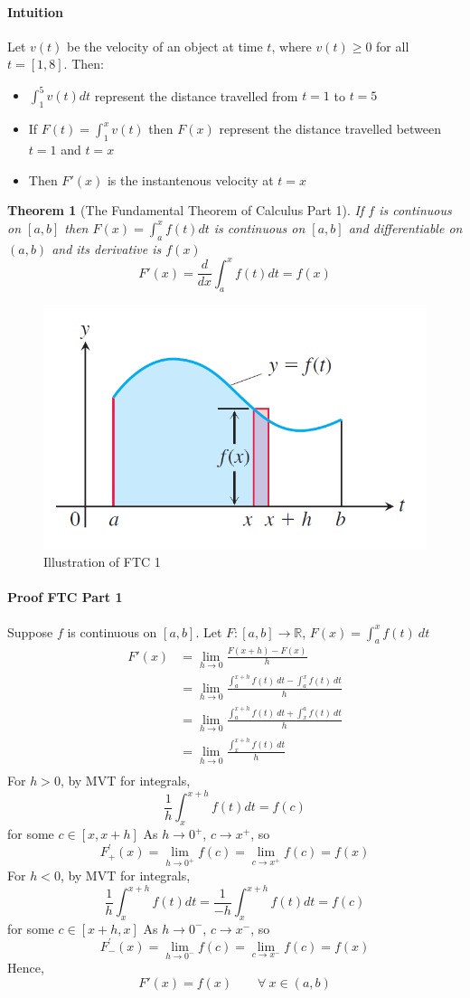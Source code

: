 \documentclass[12pt]{article}
\newtheorem{theorem}{Theorem}
\begin{document}
\paragraph{Intuition}
Let $v(t)$ be the velocity of an object at time $t$, where $v(t) \geq 0$ for all $t = [1,8]$. Then:
\begin{itemize} 
    \item $\int_1^5 v(t) dt$ represent the distance travelled from $t = 1$ to $t = 5$
    \item If $F(t) = \int_1^x v(t)$ then $F(x)$ represent the distance travelled between $t = 1$ and $t = x$
    \item Then $F'(x)$ is the instantenous velocity at $t = x$
\end{itemize}
\begin{theorem}[The Fundamental Theorem of Calculus Part 1]
    If $f$ is continuous on $[a, b]$ then $F(x) = \int_a^x f(t) dt$ is continuous on $[a, b]$ and differentiable on $(a, b)$ and its derivative is $f(x)$
    \[
        F'(x) = \frac{d}{dx} \int_a^x f(t) dt = f(x)
    \]
\end{theorem}
\begin{figure} 
    \centering
    \includegraphics[width = 0.4\linewidth]{Images/ftc 1.png}
    \caption{Illustration of FTC 1}
\end{figure}
\paragraph{Proof FTC Part 1}
Suppose $f$ is continuous on $[a, b]$. Let $F : [a, b] \to \mathbb{R}$, $F(x) = \int_a^x f(t)\: dt$
\begin{align*} 
     F'(x) &= \lim_{h \to 0} \frac{F(x + h) - F(x)}{h} \\ 
     &= \lim_{h \to 0} \frac{\int_a^{x + h} f(t)\:  dt - \int_a^{x} f(t)\: dt }{h} \\ 
     &= \lim_{h \to 0} \frac{\int_a^{x + h} f(t)\: dt + \int_x^{a} f(t)\: dt }{h} \\ 
     &= \lim_{h \to 0} \frac{\int_x^{x + h} f(t)\: dt}{h} \\ 
\end{align*}
\noindent
For $h > 0$, by MVT for integrals, 
\[
    \frac{1}{h} \int_x^{x + h} f(t) dt = f(c)
\]
for some $c \in [x, x + h]$
As $h \to 0^{+}$, $c \to x^{+}$, so
\[
    F^{'}_{+} (x) = \lim_{h \to 0^{+}} f(c) = \lim_{c \to x^{+}} f(c) = f(x)
\]
\noindent
For $h < 0$, by MVT for integrals, 
\[
    \frac{1}{h} \int_x^{x + h} f(t) dt =  \frac{1}{ - h} \int_x^{x + h} f(t) dt = f(c)
\]
for some $c \in [x + h, x]$
As $h \to 0^{-}$, $c \to x^{-}$, so
\[
    F^{'}_{-} (x) = \lim_{h \to 0^{-}} f(c) = \lim_{c \to x^{-}} f(c) = f(x)
\]
Hence, 
\[
    F'(x) = f(x)\qquad \forall\: x \in (a,b)
\]
\noindent
\end{document}
